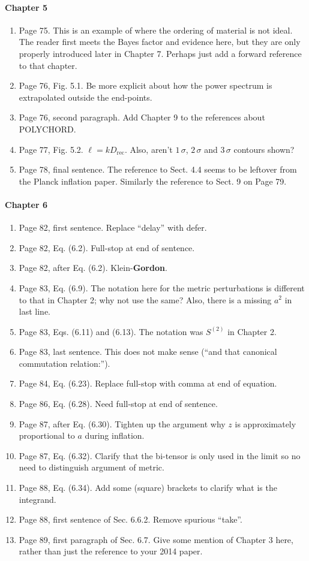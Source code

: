 \documentclass[11pt]{article}
\begin{document}
\paragraph{Chapter 5}
\begin{enumerate}
\item Page 75. This is an example of where the ordering of material is
  not ideal. The reader first meets the Bayes factor and evidence
  here, but they are only properly introduced later in Chapter
  7. Perhaps just add a forward reference to that chapter.
\item Page 76, Fig. 5.1. Be more explicit about how the power spectrum
  is extrapolated outside the end-points.
\item Page 76, second paragraph. Add Chapter 9 to the references about
  POLYCHORD.
\item Page 77, Fig. 5.2. $\ell = k D_{\text{rec}}$. Also, aren't
  $1\,\sigma$, $2\,\sigma$ and $3\,\sigma$ contours shown?
\item Page 78, final sentence. The reference to Sect. 4.4 seems to be
  leftover from the Planck inflation paper. Similarly the reference to
  Sect. 9 on Page 79.
\end{enumerate}

\paragraph{Chapter 6}
\begin{enumerate}
\item Page 82, first sentence. Replace ``delay'' with defer.
\item Page 82, Eq. (6.2). Full-stop at end of sentence.
\item Page 82, after Eq. (6.2). Klein-\textbf{Gordon}.
\item Page 83, Eq. (6.9). The notation here for the metric
  perturbations is different to that in
  Chapter 2; why not use the same? Also, there is a missing $a^2$ in
  last line.
\item Page 83, Eqs. (6.11) and (6.13). The notation was $S^{(2)}$ in
  Chapter 2.
\item Page 83, last sentence. This does not make sense (``and that
  canonical commutation relation:'').
\item Page 84, Eq. (6.23). Replace full-stop with comma at end of
  equation.
\item Page 86, Eq. (6.28). Need full-stop at end of sentence.
\item Page 87, after Eq. (6.30). Tighten up the argument why $z$ is
  approximately proportional to $a$ during inflation.
\item Page 87, Eq. (6.32). Clarify that the bi-tensor is only used in
  the limit so no need to distinguish argument of metric.
\item Page 88, Eq. (6.34). Add some (square) brackets to clarify what
  is the integrand.
\item Page 88,  first sentence of Sec. 6.6.2. Remove spurious
  ``take''.
\item Page 89, first paragraph of Sec. 6.7. Give some mention of
  Chapter 3 here, rather than just the reference to your 2014 paper. 
\end{enumerate}
\end{document}
